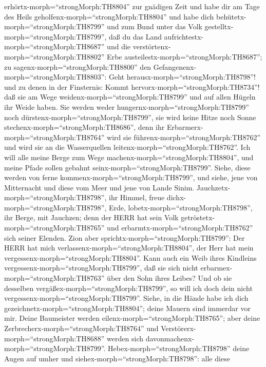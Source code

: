erhörtx-morph=``strongMorph:TH8804'' zur gnädigen Zeit und habe dir am
Tage des Heils geholfenx-morph=``strongMorph:TH8804'' und habe dich
behütetx-morph=``strongMorph:TH8799'' und zum Bund unter das Volk
gestelltx-morph=``strongMorph:TH8799'', daß du das Land
aufrichtestx-morph=``strongMorph:TH8687'' und die
verstörtenx-morph=``strongMorph:TH8802'' Erbe
austeilestx-morph=``strongMorph:TH8687'';  zu
sagenx-morph=``strongMorph:TH8800'' den
Gefangenenx-morph=``strongMorph:TH8803'': Geht
herausx-morph=``strongMorph:TH8798''! und zu denen in der Finsternis:
Kommt hervorx-morph=``strongMorph:TH8734''! daß sie am Wege
weidenx-morph=``strongMorph:TH8799'' und auf allen Hügeln ihr Weide
haben.  Sie werden weder
hungernx-morph=``strongMorph:TH8799'' noch
dürstenx-morph=``strongMorph:TH8799'', sie wird keine Hitze noch Sonne
stechenx-morph=``strongMorph:TH8686'', denn ihr
Erbarmerx-morph=``strongMorph:TH8764'' wird sie
führenx-morph=``strongMorph:TH8762'' und wird sie an die Wasserquellen
leitenx-morph=``strongMorph:TH8762''.  Ich will alle meine
Berge zum Wege machenx-morph=``strongMorph:TH8804'', und meine Pfade
sollen gebahnt seinx-morph=``strongMorph:TH8799''.  Siehe,
diese werden von ferne kommenx-morph=``strongMorph:TH8799'', und siehe,
jene von Mitternacht und diese vom Meer und jene von Lande Sinim.
 Jauchzetx-morph=``strongMorph:TH8798'', ihr Himmel, freue
dichx-morph=``strongMorph:TH8798'', Erde,
lobetx-morph=``strongMorph:TH8798'', ihr Berge, mit Jauchzen; denn der
HERR hat sein Volk getröstetx-morph=``strongMorph:TH8765'' und
erbarmtx-morph=``strongMorph:TH8762'' sich seiner Elenden. 
Zion aber sprichtx-morph=``strongMorph:TH8799'': Der HERR hat mich
verlassenx-morph=``strongMorph:TH8804'', der Herr hat mein
vergessenx-morph=``strongMorph:TH8804''.  Kann auch ein
Weib ihres Kindleins vergessenx-morph=``strongMorph:TH8799'', daß sie
sich nicht erbarmex-morph=``strongMorph:TH8763'' über den Sohn ihres
Leibes? Und ob sie desselben vergäßex-morph=``strongMorph:TH8799'', so
will ich doch dein nicht vergessenx-morph=``strongMorph:TH8799''.
 Siehe, in die Hände habe ich dich
gezeichnetx-morph=``strongMorph:TH8804''; deine Mauern sind immerdar vor
mir.  Deine Baumeister werden
eilenx-morph=``strongMorph:TH8765''; aber deine
Zerbrecherx-morph=``strongMorph:TH8764'' und
Verstörerx-morph=``strongMorph:TH8688'' werden sich
davonmachenx-morph=``strongMorph:TH8799''. 
Hebex-morph=``strongMorph:TH8798'' deine Augen auf umher und
siehex-morph=``strongMorph:TH8798'': alle diese
